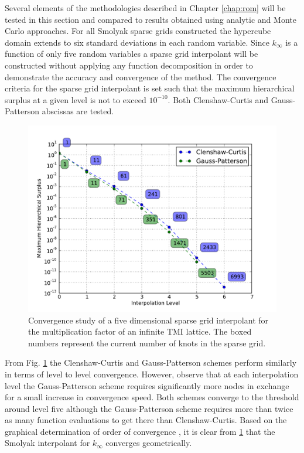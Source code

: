 Several elements of the methodologies described in Chapter \ref{chap:rom} will be tested in this section and compared to results obtained using analytic and Monte Carlo approaches. For all Smolyak sparse grids constructed the hypercube domain extends to six standard deviations in each random variable. Since $k_{\infty}$ is a function of only five random variables a sparse grid interpolant will be constructed without applying any function decomposition in order to demonstrate the accuracy and convergence of the method. The convergence criteria for the sparse grid interpolant is set such that the maximum hierarchical surplus at a given level is not to exceed $10^{-10}$. Both Clenshaw-Curtis and Gauss-Patterson abscissas are tested. 
\begin{figure}
\caption{ \label{fig:kinf_sg_convergence}
Convergence study of a five dimensional sparse grid interpolant for the  multiplication factor of an infinite TMI lattice. The boxed numbers represent the current number of knots in the sparse grid.}
 \begin{center}
  \includegraphics[scale=.75]{./Chapter3/kinf_sparse_grid_convergence.pdf}
 \end{center}
\end{figure}

From Fig. \ref{fig:kinf_sg_convergence} the Clenshaw-Curtis and Gauss-Patterson schemes perform similarly in terms of level to level convergence. However, observe that at each interpolation level the Gauss-Patterson scheme requires significantly more nodes in exchange for a small increase in convergence speed. Both schemes converge to the threshold around level five although the Gauss-Patterson scheme requires more than twice as many function evaluations to get there than Clenshaw-Curtis. Based on the graphical determination of order of convergence \cite{Boyd}, it is clear from \ref{fig:kinf_sg_convergence} that the Smolyak interpolant for $k_{\infty}$ converges geometrically.

